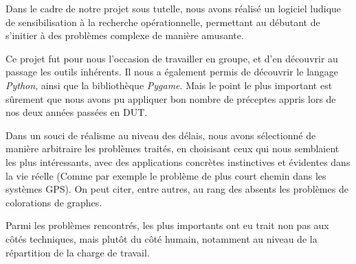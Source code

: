 Dans le cadre de notre projet sous tutelle, nous avons réalisé un logiciel ludique de sensibilisation
à la recherche opérationnelle, permettant au débutant de s'initier à des problèmes
complexe de manière amusante.

Ce projet fut pour nous l'occasion de travailler en groupe, et d'en découvrir au passage
les outils inhérents. Il nous a également permis de découvrir le langage
\emph{Python}, ainsi que la bibliothèque \emph{Pygame}.
Mais le point le plus important est sûrement que nous avons pu appliquer
bon nombre de préceptes appris lors de nos deux années passées en DUT.

Dans un souci de réalisme au niveau des délais, nous avons sélectionné de
manière arbitraire les problèmes traités, en choisisant ceux qui nous
semblaient les plus intéressants, avec des applications
concrètes instinctives et évidentes dans la vie réelle
(Comme par exemple le problème de plus court chemin dans les systèmes GPS).
On peut citer, entre autres, au rang des absents les problèmes de colorations de graphes.

Parmi les problèmes rencontrés, les plus importants ont eu trait
non pas aux côtés techniques, mais plutôt du côté humain,
notamment au niveau de la répartition de la charge de travail.
